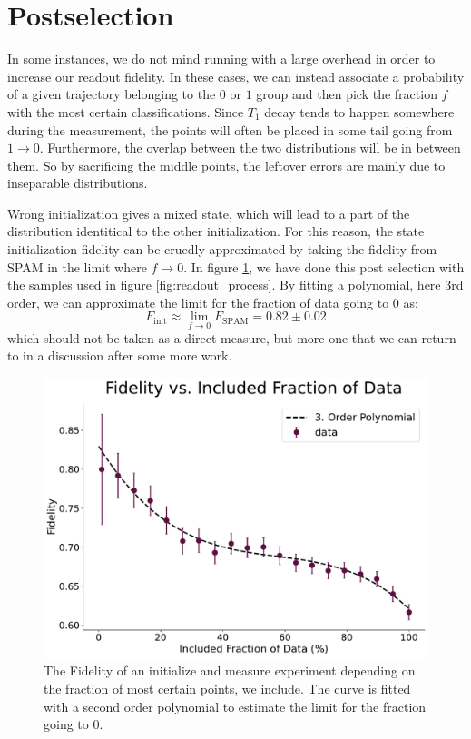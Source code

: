 \section{Postselection}\label{sec:postselection}
In some instances, we do not mind running with a large overhead in order to increase our readout fidelity. In these cases, we can instead associate a probability of a given trajectory belonging to the $0$ or $1$ group and then pick the fraction $f$ with the most certain classifications. Since $T_1$ decay tends to happen somewhere during the measurement, the points will often be placed in some tail going from $1 \to 0$. Furthermore, the overlap between the two distributions will be in between them. So by sacrificing the middle points, the leftover errors are mainly due to inseparable distributions. 

Wrong initialization gives a mixed state, which will lead to a part of the distribution identitical to the other initialization. For this reason, the state initialization fidelity can be cruedly approximated by taking the fidelity from SPAM in the limit where $f\to 0$. In figure \ref{fig:postselection_plot}, we have done this post selection with the samples used in figure \ref{fig:readout_process}. By fitting a polynomial, here 3rd order, we can approximate the limit for the fraction of data going to 0 as:
\begin{equation}
    F_{\text{init}} \approx \lim_{f \to 0} F_{\text{SPAM}} = 0.82 \pm 0.02
\end{equation}
which should not be taken as a direct measure, but more one that we can return to in a discussion after some more work.


\begin{figure}[t]
    \centering
    \includegraphics[]{Readout/Figs/fidelity_vs_included_fraction.pdf}
    \caption{The Fidelity of an initialize and measure experiment depending on the fraction of most certain points, we include. The curve is fitted with a second order polynomial to estimate the limit for the fraction going to $0$.}
    \label{fig:postselection_plot}
\end{figure}

